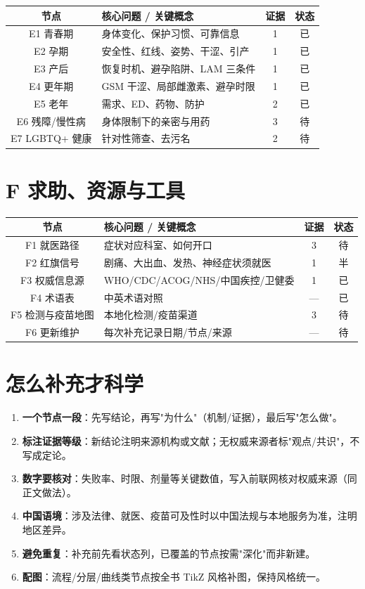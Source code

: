 \begin{tabularx}{\linewidth}{C X c c}
\toprule
\textbf{节点} & \textbf{核心问题 / 关键概念} & \textbf{证据} & \textbf{状态} \\
\midrule
E1 青春期 & 身体变化、保护习惯、可靠信息 & 1 & 已 \\
E2 孕期 & 安全性、红线、姿势、干涩、引产 & 1 & 已 \\
E3 产后 & 恢复时机、避孕陷阱、LAM 三条件 & 1 & 已 \\
E4 更年期 & GSM 干涩、局部雌激素、避孕时限 & 1 & 已 \\
E5 老年 & 需求、ED、药物、防护 & 2 & 已 \\
E6 残障/慢性病 & 身体限制下的亲密与用药 & 3 & 待 \\
E7 LGBTQ+ 健康 & 针对性筛查、去污名 & 2 & 待 \\
\bottomrule
\end{tabularx}

\section{F 求助、资源与工具}

\begin{tabularx}{\linewidth}{C X c c}
\toprule
\textbf{节点} & \textbf{核心问题 / 关键概念} & \textbf{证据} & \textbf{状态} \\
\midrule
F1 就医路径 & 症状对应科室、如何开口 & 3 & 待 \\
F2 红旗信号 & 剧痛、大出血、发热、神经症状须就医 & 1 & 半 \\
F3 权威信息源 & WHO/CDC/ACOG/NHS/中国疾控/卫健委 & 1 & 已 \\
F4 术语表 & 中英术语对照 & --- & 已 \\
F5 检测与疫苗地图 & 本地化检测/疫苗渠道 & 3 & 待 \\
F6 更新维护 & 每次补充记录日期/节点/来源 & --- & 待 \\
\bottomrule
\end{tabularx}

\section{怎么补充才科学}

\begin{enumerate}[leftmargin=2em,itemsep=0.3em]
  \item \textbf{一个节点一段}：先写结论，再写"为什么"（机制/证据），最后写"怎么做"。
  \item \textbf{标注证据等级}：新结论注明来源机构或文献；无权威来源者标"观点/共识"，不写成定论。
  \item \textbf{数字要核对}：失败率、时限、剂量等关键数值，写入前联网核对权威来源（同正文做法）。
  \item \textbf{中国语境}：涉及法律、就医、疫苗可及性时以中国法规与本地服务为准，注明地区差异。
  \item \textbf{避免重复}：补充前先看状态列，已覆盖的节点按需"深化"而非新建。
  \item \textbf{配图}：流程/分层/曲线类节点按全书 TikZ 风格补图，保持风格统一。
\end{enumerate}

